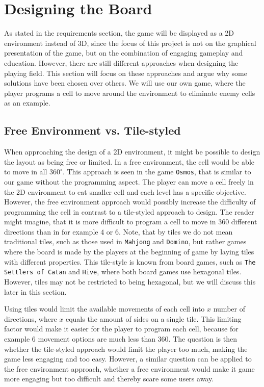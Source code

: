 \section{Designing the Board}
\label{sec:designing_playing_field}

As stated in the requirements section, the game will be displayed as a 2D environment instead of 3D, since the focus of this project is not on the graphical presentation of the game, but on the combination of engaging gameplay and education.
However, there are still different approaches when designing the playing field.
This section will focus on these approaches and argue why some solutions have been chosen over others.
We will use our own game, where the player programs a cell to move around the environment to eliminate enemy cells as an example.

\subsection{Free Environment vs. Tile-styled}
When approaching the design of a 2D environment, it might be possible to design the layout as being free or limited.
In a free environment, the cell would be able to move in all $360^{\circ}$.
This approach is seen in the game \texttt{Osmos}, that is similar to our game without the programming aspect.
The player can move a cell freely in the 2D environment to eat smaller cell and each level has a specific objective.
However, the free environment approach would possibly increase the difficulty of programming the cell in contrast to a tile-styled approach to design.
The reader might imagine, that it is more difficult to program a cell to move in $360$ different directions than in for example $4$ or $6$.
Note, that by tiles we do not mean traditional tiles, such as those used in \texttt{Mahjong} and \texttt{Domino}, but rather games where the board is made by the players at the beginning of game by laying tiles with different properties.
This tile-style is known from board games, such as \texttt{The Settlers of Catan} and \texttt{Hive}, where both board games use hexagonal tiles.
However, tiles may not be restricted to being hexagonal, but we will discuss this later in this section.\newline

Using tiles would limit the available movements of each cell into $x$ number of directions, where $x$ equals the amount of sides on a single tile.
This limiting factor would make it easier for the player to program each cell, because for example $6$ movement options are much less than $360$.
The question is then whether the tile-styled approach would limit the player too much, making the game less engaging and too easy.
However, a similar question can be applied to the free environment approach, whether a free environment would make it game more engaging but too difficult and thereby scare some users away.\newline


